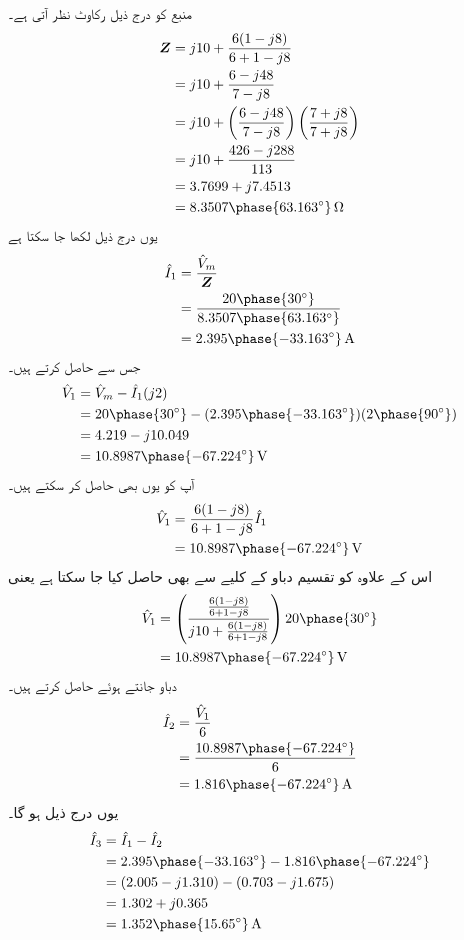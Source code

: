منبع کو درج ذیل رکاوٹ نظر آتی ہے۔
\begin{align*}
\bZ&=j10+\frac{6(1-j8)}{6+1-j8}\\
&=j10 +\frac{6-j48}{7-j8}\\
&=j10 +\left(\frac{6-j48}{7-j8}\right)\left(\frac{7+j8}{7+j8}\right)\\
&=j10+\frac{426-j288}{113}\\
&=3.7699+j7.4513\\
&=8.3507\phase{63.163^{\circ}}\,\si{\ohm}
\end{align*}
یوں درج ذیل لکھا جا سکتا ہے
\begin{align*}
\hat{I}_1&=\frac{\hat{V}_m}{\bZ}\\
&=\frac{20\phase{30^{\circ}}}{8.3507\phase{63.163^{\circ}}}\\
&=2.395\phase{-33.163^{\circ}}\, \si{\ampere}
\end{align*}
جس سے  حاصل کرتے ہیں۔
\begin{align*}
\hat{V}_1&=\hat{V}_m-\hat{I}_1 (j2)\\
&=20\phase{30^{\circ}}-(2.395\phase{-33.163^{\circ}})( 2\phase{90^{\circ}})\\
&=4.219-j10.049\\
&=10.8987\phase{-67.224^{\circ}}\,\si{\volt}
\end{align*}
آپ  کو یوں بھی حاصل کر سکتے ہیں۔
\begin{align*}
\hat{V}_1&=\frac{6(1-j8)}{6+1-j8} \hat{I}_1\\
&=10.8987\phase{-67.224^{\circ}}\,\si{\volt}
\end{align*}
اس کے علاوہ  کو تقسیم دباو کے کلیے سے بھی حاصل کیا جا سکتا ہے یعنی
\begin{align*}
\hat{V}_1&=\left(\frac{\frac{6(1-j8)}{6+1-j8}}{j10+\frac{6(1-j8)}{6+1-j8}}\right) 20\phase{30^{\circ}}\\
&=10.8987\phase{-67.224^{\circ}}\,\si{\volt}
\end{align*}
دباو  جانتے ہوئے  حاصل کرتے ہیں۔
\begin{align*}
\hat{I}_2&=\frac{\hat{V}_1}{6}\\
&=\frac{10.8987\phase{-67.224^{\circ}}}{6}\\
&=1.816\phase{-67.224^{\circ}}\,\si{\ampere}
\end{align*}
یوں  درج ذیل ہو گا۔
\begin{align*}
\hat{I}_3 &=\hat{I}_1-\hat{I}_2\\
&=2.395\phase{-33.163^{\circ}}-1.816\phase{-67.224^{\circ}}\\
&=(2.005-j1.310)-(0.703-j1.675)\\
&=1.302+j0.365\\
&=1.352\phase{15.65^{\circ}}\,\si{\ampere}
\end{align*}
